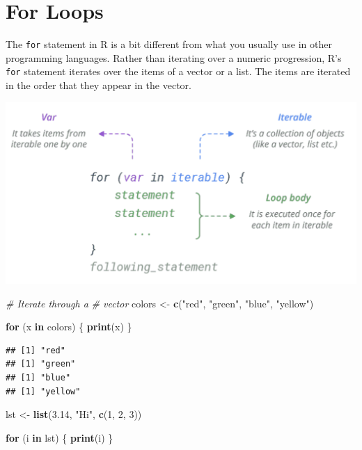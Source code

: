 \documentclass[
]{book}
\newenvironment{Shaded}{\begin{snugshade}}{\end{snugshade}}
\newcommand{\CommentTok}[1]{\textcolor[rgb]{0.56,0.35,0.01}{\textit{#1}}}
\newcommand{\ControlFlowTok}[1]{\textcolor[rgb]{0.13,0.29,0.53}{\textbf{#1}}}
\newcommand{\DecValTok}[1]{\textcolor[rgb]{0.00,0.00,0.81}{#1}}
\newcommand{\FloatTok}[1]{\textcolor[rgb]{0.00,0.00,0.81}{#1}}
\newcommand{\KeywordTok}[1]{\textcolor[rgb]{0.13,0.29,0.53}{\textbf{#1}}}
\newcommand{\NormalTok}[1]{#1}
\newcommand{\StringTok}[1]{\textcolor[rgb]{0.31,0.60,0.02}{#1}}
\begin{document}
\hypertarget{for-loops}{%
\section{For Loops}\label{for-loops}}

The \texttt{for} statement in R is a bit different from what you usually use in other programming languages. Rather than iterating over a numeric progression, R's \texttt{for} statement iterates over the items of a vector or a list. The items are iterated in the order that they appear in the vector.

\begin{center}\includegraphics[width=16.11in]{images/ForLoop} \end{center}

\begin{Shaded}
\begin{Highlighting}[]
\CommentTok{# Iterate through a}
\CommentTok{# vector}
\NormalTok{colors <-}\StringTok{ }\KeywordTok{c}\NormalTok{(}\StringTok{"red"}\NormalTok{, }\StringTok{"green"}\NormalTok{,}
    \StringTok{"blue"}\NormalTok{, }\StringTok{"yellow"}\NormalTok{)}

\ControlFlowTok{for}\NormalTok{ (x }\ControlFlowTok{in}\NormalTok{ colors) \{}
    \KeywordTok{print}\NormalTok{(x)}
\NormalTok{\}}
\end{Highlighting}
\end{Shaded}

\begin{verbatim}
## [1] "red"
## [1] "green"
## [1] "blue"
## [1] "yellow"
\end{verbatim}

\begin{Shaded}
\begin{Highlighting}[]
\NormalTok{lst <-}\StringTok{ }\KeywordTok{list}\NormalTok{(}\FloatTok{3.14}\NormalTok{, }\StringTok{"Hi"}\NormalTok{,}
    \KeywordTok{c}\NormalTok{(}\DecValTok{1}\NormalTok{, }\DecValTok{2}\NormalTok{, }\DecValTok{3}\NormalTok{))}

\ControlFlowTok{for}\NormalTok{ (i }\ControlFlowTok{in}\NormalTok{ lst) \{}
    \KeywordTok{print}\NormalTok{(i)}
\NormalTok{\}}
\end{Highlighting}
\end{Shaded}
\end{document}
